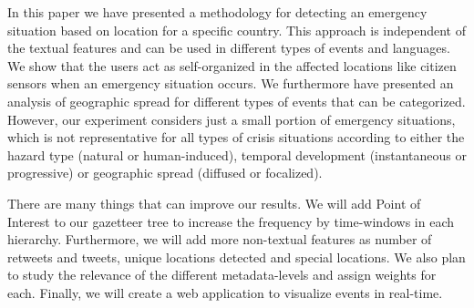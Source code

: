 \documentclass[sigconf]{acmart}
\begin{document}
In this paper we have presented a methodology for detecting an emergency situation based on location for a specific country. This approach is independent of the textual features and can be used in different types of events and languages. We show that the users act as self-organized in the affected locations like citizen sensors when an emergency situation occurs. We furthermore have presented an analysis of geographic spread for different types of events that can be categorized. However, our experiment considers just a small portion of emergency situations, which is not representative for all types of crisis situations according to either the hazard type (natural or human-induced), temporal development (instantaneous or progressive) or geographic spread (diffused or focalized).

There are many things that can improve our results. We will add Point of Interest to our gazetteer tree to increase the frequency by time-windows in each hierarchy. Furthermore, we will add more non-textual features as number of retweets and tweets, unique locations detected and special locations. We also plan to study the relevance of the different metadata-levels and assign weights for each. Finally, we will create a web application to visualize events in real-time.

	




 
\end{document}
